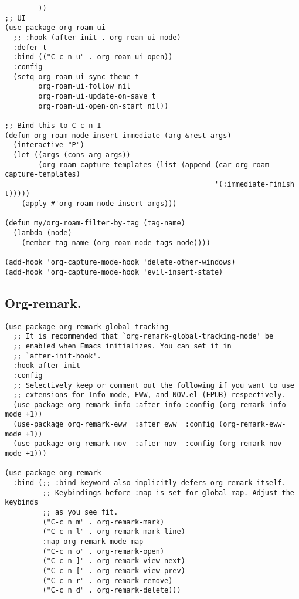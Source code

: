 \documentclass[11pt]{article}
\begin{document}
\begin{verbatim}
        ))
;; UI
(use-package org-roam-ui
  ;; :hook (after-init . org-roam-ui-mode)
  :defer t
  :bind (("C-c n u" . org-roam-ui-open))
  :config
  (setq org-roam-ui-sync-theme t
        org-roam-ui-follow nil
        org-roam-ui-update-on-save t
        org-roam-ui-open-on-start nil))

;; Bind this to C-c n I
(defun org-roam-node-insert-immediate (arg &rest args)
  (interactive "P")
  (let ((args (cons arg args))
        (org-roam-capture-templates (list (append (car org-roam-capture-templates)
                                                  '(:immediate-finish t)))))
    (apply #'org-roam-node-insert args)))

(defun my/org-roam-filter-by-tag (tag-name)
  (lambda (node)
    (member tag-name (org-roam-node-tags node))))

(add-hook 'org-capture-mode-hook 'delete-other-windows)
(add-hook 'org-capture-mode-hook 'evil-insert-state)
\end{verbatim}
\subsection{Org-remark.}
\label{sec:orga0e0f76}
\begin{verbatim}
(use-package org-remark-global-tracking
  ;; It is recommended that `org-remark-global-tracking-mode' be
  ;; enabled when Emacs initializes. You can set it in
  ;; `after-init-hook'.
  :hook after-init
  :config
  ;; Selectively keep or comment out the following if you want to use
  ;; extensions for Info-mode, EWW, and NOV.el (EPUB) respectively.
  (use-package org-remark-info :after info :config (org-remark-info-mode +1))
  (use-package org-remark-eww  :after eww  :config (org-remark-eww-mode +1))
  (use-package org-remark-nov  :after nov  :config (org-remark-nov-mode +1)))

(use-package org-remark
  :bind (;; :bind keyword also implicitly defers org-remark itself.
         ;; Keybindings before :map is set for global-map. Adjust the keybinds
         ;; as you see fit.
         ("C-c n m" . org-remark-mark)
         ("C-c n l" . org-remark-mark-line)
         :map org-remark-mode-map
         ("C-c n o" . org-remark-open)
         ("C-c n ]" . org-remark-view-next)
         ("C-c n [" . org-remark-view-prev)
         ("C-c n r" . org-remark-remove)
         ("C-c n d" . org-remark-delete)))
\end{verbatim}
\end{document}
